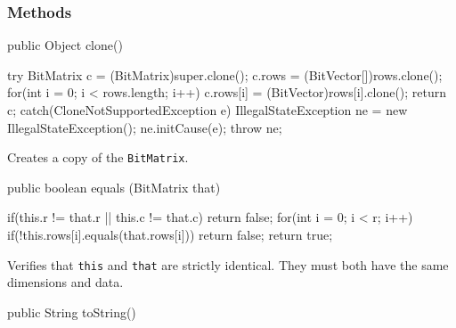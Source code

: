 \subsubsection* {Methods}
\begin{code}
   public Object clone() \begin{hide} {
      try{
         BitMatrix c = (BitMatrix)super.clone();
         c.rows = (BitVector[])rows.clone();
         for(int i = 0; i < rows.length; i++)
            c.rows[i] = (BitVector)rows[i].clone();
         return c;
      } catch(CloneNotSupportedException e) {
         IllegalStateException ne = new IllegalStateException();
         ne.initCause(e);
         throw ne;
      }
   } \end{hide}
\end{code}
\begin{tabb} Creates a copy of the \texttt{BitMatrix}.
\end{tabb}
\begin{htmlonly}
\end{htmlonly}
\begin{code}

   public boolean equals (BitMatrix that) \begin{hide} {
      if(this.r != that.r || this.c != that.c)
         return false;
      for(int i = 0; i < r; i++)
         if(!this.rows[i].equals(that.rows[i]))
            return false;
      return true;
   } \end{hide}
\end{code}
\begin{tabb} Verifies that \texttt{this} and  \texttt{that} are strictly
 identical. They must both have the same dimensions and data.
\end{tabb}
\begin{htmlonly}
\end{htmlonly}
\begin{code}

   public String toString() \begin{hide} {
      StringBuffer sb = new StringBuffer();

      // on affiche les bits sur les lignes dans l'order inverse de l'ordre
      // affiche pour le BitVector pour que le bit a (0,0) soit en haut
      // a gauche

      sb.append("{ ");
      for(int i = 0; i < rows.length - 1; i++) {
         for(int j = 0; j < rows[i].size(); j++)
            sb.append(rows[i].getBool(j) ? "1" : "0");
         sb.append(PrintfFormat.NEWLINE + "  ");
      }
      if(r > 0) {
         for(int j = 0; j < c; j++)
            sb.append(rows[r-1].getBool(j) ? "1" : "0");
         sb.append(" }");
      } else
         sb.append(" }");

      return sb.toString();
   } \end{hide}
\end{code}
